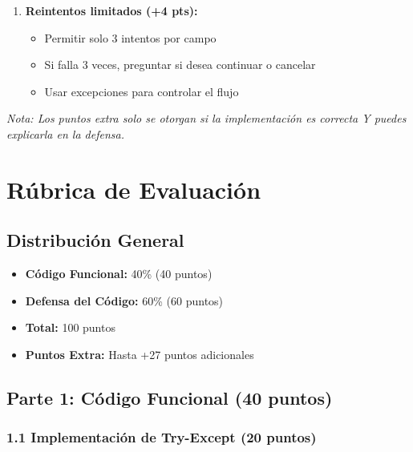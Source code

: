 \documentclass[12pt,a4paper]{article}
\begin{document}
\begin{enumerate}[leftmargin=*]
    \item \textbf{Reintentos limitados (+4 pts):}
    \begin{itemize}
        \item Permitir solo 3 intentos por campo
        \item Si falla 3 veces, preguntar si desea continuar o cancelar
        \item Usar excepciones para controlar el flujo
    \end{itemize}
\end{enumerate}

\textit{Nota: Los puntos extra solo se otorgan si la implementación es correcta Y puedes explicarla en la defensa.}

\newpage

\section{Rúbrica de Evaluación}

\subsection{Distribución General}

\begin{itemize}
    \item \textbf{Código Funcional:} 40\% (40 puntos)
    \item \textbf{Defensa del Código:} 60\% (60 puntos)
    \item \textbf{Total:} 100 puntos
    \item \textbf{Puntos Extra:} Hasta +27 puntos adicionales
\end{itemize}

\subsection{Parte 1: Código Funcional (40 puntos)}

\subsubsection{1.1 Implementación de Try-Except (20 puntos)}
\end{document}
